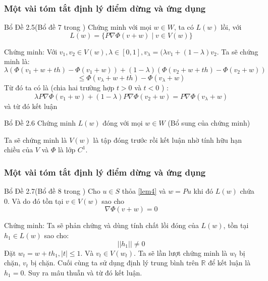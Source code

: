 \documentclass[11pt]{beamer}
\numberwithin{equation}{section}
\theoremstyle{plain}
\theoremstyle{definition}
\theoremstyle{remark}
\begin{document}


\begin{frame}
\frametitle{Một vài tóm tắt định lý điểm dừng và ứng dụng }
\begin{block}{Bổ Đề 2.5(Bổ đề 7 trong \cite{YJMM})}
Chứng minh với mọi $w \in W$, ta có $L(w)$ lồi, với
  \[ L(w)= \{ P \nabla \Phi(v+w) \mid v \in V(w)\}\]
\end{block}
Chứng minh: Với $v_1,v_2\in V(w),\lambda \in [0,1],v_{\lambda}=(\lambda v_1 +(1-\lambda)v_2$.
Ta sẽ chứng minh là: $$\lambda ( \Phi (v_1+w+th)-\Phi(v_1+w )) + (1-\lambda ) (\Phi(v_2+w+th)-\Phi(v_2+w))$$$$\leq \Phi(v_\lambda +w+th)-\Phi(v_\lambda +w)$$
Từ đó ta có là (chia hai trường hợp $t>0$ và $t<0$ ) :
$$\lambda P \nabla \Phi(v_1+w) + (1-\lambda )P \nabla \Phi (v_2 +w) = P \nabla \Phi(v_\lambda +w)$$
và từ đó kết luận
\end{frame}



\begin{frame}
\begin{block}{Bổ Đề 2.6}
Chứng minh $L(w)$ đóng với mọi $w \in W$
(Bổ sung của chứng minh)
\end{block}
Ta sẽ chứng minh là $V(w)$ là tập đóng trước rồi kết luận nhờ tính hữu hạn chiều của $V$ và $\Phi$ là lớp $C^1$.
\end{frame}



\begin{frame}
\frametitle{Một vài tóm tắt định lý điểm dừng và ứng dụng }
\begin{block}{Bổ Đề 2.7(Bổ đề 8 trong \cite{YJMM})}
 Cho $u \in S$ thỏa \eqref{lem4} và $w=Pu$ khi đó $L(w)$ chứa 0. Và do đó tồn tại $v \in V(w)$ sao cho 
\[ \nabla \Phi(v +w)=0\]
\end{block}
Chứng minh: Ta sẽ phản chứng và dùng tính chất lồi đóng của $L(w)$, tồn tại $h_1\in L(w)$ sao cho: $$||h_1||\neq 0$$
Đặt $w_{t}=w+th_1,|t|\leq 1$. Và $v_t\in V(w_t)$. Ta sẽ lần lượt chứng minh là $w_t$ bị chặn, $v_t$ bị chặn. Cuối cùng ta sử dụng định lý trung bình trên $\mathbb{R}$ để kết luận là $h_1=0$. Suy ra mâu thuẫn và từ đó kết luận.
\end{frame}
\end{document}
